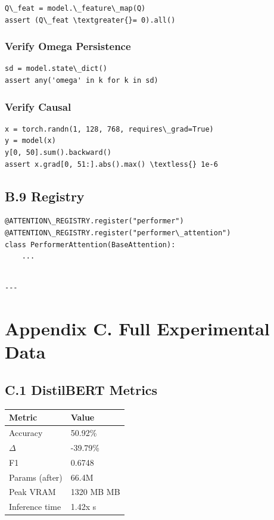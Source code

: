 \begin{lstlisting}
Q\_feat = model.\_feature\_map(Q)
assert (Q\_feat \textgreater{}= 0).all()
\end{lstlisting}

\subsubsection{Verify Omega Persistence}

\begin{lstlisting}
sd = model.state\_dict()
assert any('omega' in k for k in sd)
\end{lstlisting}

\subsubsection{Verify Causal}

\begin{lstlisting}
x = torch.randn(1, 128, 768, requires\_grad=True)
y = model(x)
y[0, 50].sum().backward()
assert x.grad[0, 51:].abs().max() \textless{} 1e-6
\end{lstlisting}

\subsection{B.9 Registry}

\begin{lstlisting}
@ATTENTION\_REGISTRY.register("performer")
@ATTENTION\_REGISTRY.register("performer\_attention")
class PerformerAttention(BaseAttention):
    ...
\end{lstlisting}
\begin{lstlisting}

---
\end{lstlisting}


\section{Appendix C. Full Experimental Data}

\subsection{C.1 DistilBERT Metrics}

\begin{table}[H]
\centering
\small
\begin{tabular}{ll}
\toprule
\textbf{Metric} & \textbf{Value} \\
\midrule
Accuracy & 50.92\% \\
$\Delta$ & -39.79\% \\
F1 & 0.6748 \\
Params (after) & 66.4M \\
Peak VRAM & 1320 MB MB \\
Inference time & 1.42x s \\
\bottomrule
\end{tabular}
\end{table}

